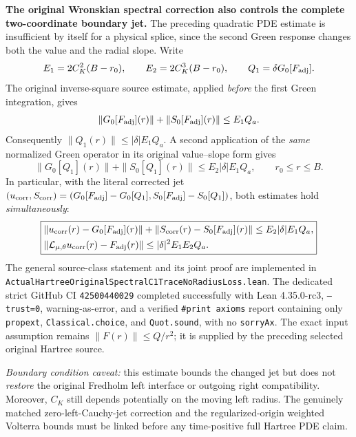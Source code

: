 \documentclass[11pt]{amsart}
\begin{document}
\medskip
\noindent\textbf{The original Wronskian spectral correction also
controls the complete two-coordinate boundary jet.}
The preceding quadratic PDE estimate is insufficient by itself
for a physical splice, since the second Green response changes
both the value and the radial slope. Write
\[
 E_1=2C_K^2(B-r_0),\qquad
 E_2=2C_K^3(B-r_0),\qquad
 Q_1=\delta G_0[F_{\rm adj}].
\]
The original inverse-square source estimate, applied \emph{before}
the first Green integration, gives
\[
 \|G_0[F_{\rm adj}](r)\|+
 \|S_0[F_{\rm adj}](r)\|
 \le E_1Q_a.
\]
Consequently \(\|Q_1(r)\|\le |\delta|E_1Q_a\).
A second application of the \emph{same} normalized Green operator
in its original value--slope form gives
\[
 \|G_0[Q_1](r)\|+\|S_0[Q_1](r)\|
 \le E_2|\delta|E_1Q_a,\qquad r_0\le r\le B.
\]
In particular, with the literal corrected jet
\(
 (u_{\rm corr},S_{\rm corr})=
 (G_0[F_{\rm adj}]-G_0[Q_1],
  S_0[F_{\rm adj}]-S_0[Q_1])
\), both estimates hold \emph{simultaneously}:
\[
 \boxed{\begin{aligned}
 &\|u_{\rm corr}(r)-G_0[F_{\rm adj}](r)\|
   +\|S_{\rm corr}(r)-S_0[F_{\rm adj}](r)\|
     \le E_2|\delta|E_1Q_a,\\
 &\|\mathcal L_{\mu,\theta}u_{\rm corr}(r)
      -F_{\rm adj}(r)\|
     \le |\delta|^2E_1E_2Q_a.
 \end{aligned}}
\]
The general source-class statement and its joint proof are implemented
in \texttt{ActualHartreeOriginalSpectralC1TraceNoRadiusLoss.lean}.
The dedicated strict GitHub CI
\texttt{42500440029} completed successfully with Lean
4.35.0-rc3, \texttt{--trust=0}, warning-as-error,
and a verified \texttt{\#print axioms} report containing only
\texttt{propext}, \texttt{Classical.choice}, and
\texttt{Quot.sound}, with no \texttt{sorryAx}.
The exact input assumption remains \(\|F(r)\|\le Q/r^2\);
it is supplied by the preceding selected original Hartree source.

\emph{Boundary condition caveat:}
this estimate bounds the changed jet but does not \emph{restore}
the original Fredholm left interface or outgoing right compatibility.
Moreover, \(C_K\) still depends potentially on the moving left
radius. The genuinely matched zero-left-Cauchy-jet correction
and the regularized-origin weighted Volterra bounds must be
linked before any time-positive full Hartree PDE claim.
\end{document}
